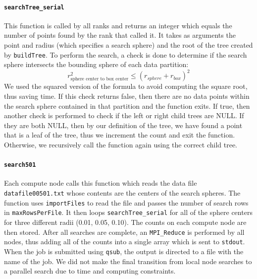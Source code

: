 \documentclass{article}
\begin{document}
\paragraph{\texttt{searchTree\_serial}}
This function is called by all ranks and returns an integer which equals the number of points found by the rank that called it. It takes as arguments the point and radius (which specifies a search sphere) and the root of the tree created by \texttt{buildTree}. To perform the search, a check is done to determine if the search sphere intersects the bounding sphere of each data partition:
\begin{equation}
		r^2_\textrm{sphere center to box center} \le (r_{sphere} + r_{box})^2
\end{equation}
We used the squared version of the formula to avoid computing the square root, thus saving time. If this check returns false, then there are no data points within the search sphere contained in that partition and the function exits. If true, then another check is performed to check if the left or right child trees are NULL. If they are both NULL, then by our definition of the tree, we have found a point that is a leaf of the tree, thus we increment the count and exit the function. Otherwise, we recursively call the function again using the correct child tree.

%
%

\paragraph{\texttt{search501}}
%
%

Each compute node calls this function which reads the data file \\
\texttt{datafile00501.txt} whose contents are the centers of the search spheres. The function uses \texttt{importFiles} to read the file and passes the number of search rows in \texttt{maxRowsPerFile}. It then loops \texttt{searchTree\_serial} for all of the sphere centers for three different radii (0.01, 0.05, 0.10). The counts on each compute node are then stored. After all searches are complete, an \texttt{MPI\_Reduce} is performed by all nodes, thus adding all of the counts into a single array which is sent to \texttt{stdout}. When the job is submitted using \texttt{qsub}, the output is directed to a file with the name of the job. We did not make the final transition from local node searches to a parallel search due to time and computing constraints.
\end{document}
